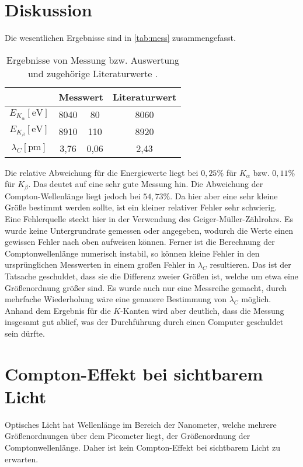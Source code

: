\section{Diskussion}
\label{sec:Diskussion}
Die wesentlichen Ergebnisse sind in \autoref{tab:mess} zusammengefasst.
\begin{table}
	\centering
	\begin{tabular}{c c @{${}\pm{}$} c c}
		\toprule
	& \multicolumn{2}{c}{Messwert} 
	& Literaturwert \\
	\midrule
		$E_{K_\alpha} [\text{eV}]$ & 8040 & 80 & 8060\\
		$E_{K_\beta} [\text{eV}]$ & 8910 & 110 & 8920\\
		$\lambda_{C} [\text{pm}]$ & 3,76 & 0,06 & 2,43\\
		\bottomrule
	\end{tabular}
	\caption{Ergebnisse von Messung bzw. Auswertung und zugehörige Literaturwerte
	\cite{ld-didactic.de} \cite{nist}.}
	\label{tab:mess}
\end{table}
Die relative Abweichung für die Energiewerte liegt bei $0,25\%$ für $K_\alpha$ 
bzw. $0,11\%$ für $K_\beta$. Das deutet auf eine sehr gute Messung hin. Die Abweichung der
Compton-Wellenlänge liegt jedoch bei $54,73\%$. Da hier aber eine sehr kleine Größe
bestimmt werden sollte, ist ein kleiner relativer Fehler sehr schwierig.
\\
Eine Fehlerquelle steckt hier in der Verwendung des Geiger-Müller-Zählrohrs. Es
wurde keine Untergrundrate gemessen oder angegeben, wodurch die Werte einen gewissen
Fehler nach oben aufweisen können. Ferner ist die Berechnung der Comptonwellenlänge
numerisch instabil, so können kleine Fehler in den ursprünglichen Messwerten in einem
großen Fehler in $\lambda_C$ resultieren. Das ist der Tatsache geschuldet, dass sie die
Differenz zweier Größen ist, welche um etwa eine Größenordnung größer sind. Es wurde auch
nur eine Messreihe gemacht, durch mehrfache Wiederholung wäre eine genauere Bestimmung von
$\lambda_C$ möglich.
\\
Anhand dem Ergebnis für die $K$-Kanten wird aber deutlich, dass die Messung insgesamt gut
ablief, was der Durchführung durch einen Computer geschuldet sein dürfte.

\section{Compton-Effekt bei sichtbarem Licht}
\label{sec:Compton-Effekt bei sichtbarem Licht}
Optisches Licht hat Wellenlänge im Bereich der Nanometer, welche mehrere Größenordnungen
über dem Picometer liegt, der Größenordnung der Comptonwellenlänge. Daher ist kein
Compton-Effekt bei sichtbarem Licht zu erwarten.

